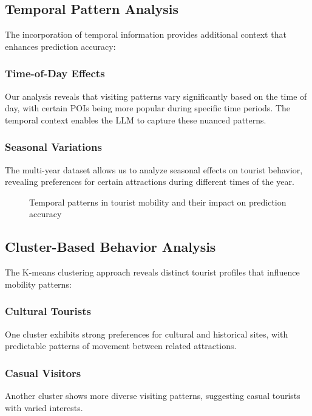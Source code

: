 \documentclass[12pt,a4paper]{article}
\begin{document}
\subsection{Temporal Pattern Analysis}

The incorporation of temporal information provides additional context that enhances prediction accuracy:

\subsubsection{Time-of-Day Effects}
Our analysis reveals that visiting patterns vary significantly based on the time of day, with certain POIs being more popular during specific time periods. The temporal context enables the LLM to capture these nuanced patterns.

\subsubsection{Seasonal Variations}
The multi-year dataset allows us to analyze seasonal effects on tourist behavior, revealing preferences for certain attractions during different times of the year.

\begin{figure}[H]
\centering
\caption{Temporal patterns in tourist mobility and their impact on prediction accuracy}
\label{fig:temporal_analysis}
\end{figure}

\subsection{Cluster-Based Behavior Analysis}

The K-means clustering approach reveals distinct tourist profiles that influence mobility patterns:

\subsubsection{Cultural Tourists}
One cluster exhibits strong preferences for cultural and historical sites, with predictable patterns of movement between related attractions.

\subsubsection{Casual Visitors}
Another cluster shows more diverse visiting patterns, suggesting casual tourists with varied interests.
\end{document}
